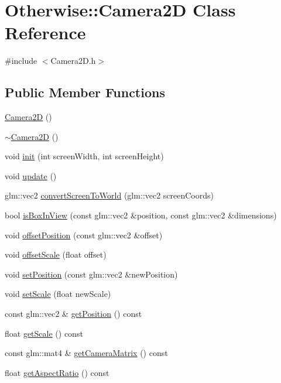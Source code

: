 \hypertarget{class_otherwise_1_1_camera2_d}{}\section{Otherwise\+:\+:Camera2D Class Reference}
\label{class_otherwise_1_1_camera2_d}


{\ttfamily \#include $<$Camera2\+D.\+h$>$}

\subsection*{Public Member Functions}
\begin{DoxyCompactItemize}
\item 
\hyperlink{class_otherwise_1_1_camera2_d_a5c47dfba158bee50e826c01f8168d4eb}{Camera2D} ()
\item 
\hyperlink{class_otherwise_1_1_camera2_d_a4a2fd76b13d85479385190d64adce2ba}{$\sim$\+Camera2D} ()
\item 
void \hyperlink{class_otherwise_1_1_camera2_d_a87afc1906611723fc9ff4f8af665d32e}{init} (int screen\+Width, int screen\+Height)
\item 
void \hyperlink{class_otherwise_1_1_camera2_d_afffd5de77063c6728af86f71ec7b6233}{update} ()
\item 
glm\+::vec2 \hyperlink{class_otherwise_1_1_camera2_d_a47d548a2620e1ebaa722d55fc5f05fc9}{convert\+Screen\+To\+World} (glm\+::vec2 screen\+Coords)
\item 
bool \hyperlink{class_otherwise_1_1_camera2_d_a0a2c8888d0051036af74cfed1d835252}{is\+Box\+In\+View} (const glm\+::vec2 \&position, const glm\+::vec2 \&dimensions)
\item 
void \hyperlink{class_otherwise_1_1_camera2_d_a5eb7a0a18dbd5a40f005665badb61987}{offset\+Position} (const glm\+::vec2 \&offset)
\item 
void \hyperlink{class_otherwise_1_1_camera2_d_a29fb698c45d19c954201faaf85c17d36}{offset\+Scale} (float offset)
\item 
void \hyperlink{class_otherwise_1_1_camera2_d_ada022899c5f23e8b36120b6b1b2dc364}{set\+Position} (const glm\+::vec2 \&new\+Position)
\item 
void \hyperlink{class_otherwise_1_1_camera2_d_ab1403d65989c8aaf5f1a573275d9e2e8}{set\+Scale} (float new\+Scale)
\item 
const glm\+::vec2 \& \hyperlink{class_otherwise_1_1_camera2_d_a1db406c634d202108331a628ec7f9ee8}{get\+Position} () const
\item 
float \hyperlink{class_otherwise_1_1_camera2_d_a233977db59a40e573878f3e9ec2de6bf}{get\+Scale} () const
\item 
const glm\+::mat4 \& \hyperlink{class_otherwise_1_1_camera2_d_a535c2f94d615af1bfe30496266c0c32e}{get\+Camera\+Matrix} () const
\item 
float \hyperlink{class_otherwise_1_1_camera2_d_a4f25b7bc508530bb2038179eb6ab4a0a}{get\+Aspect\+Ratio} () const
\end{DoxyCompactItemize}
